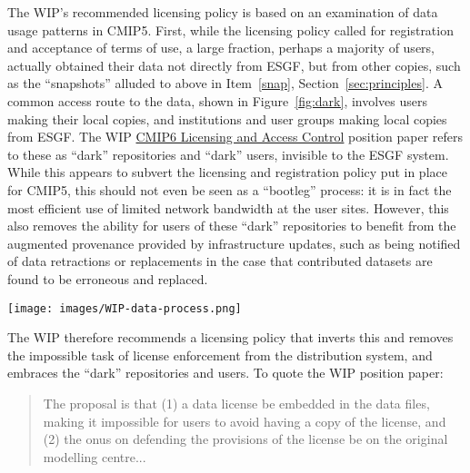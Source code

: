 \documentclass[gmd,manuscript]{copernicus}
\newcommand{\figref}[1] {\mbox{Figure   \ref{fig:#1}}}
\newcommand{\secref}[1] {\mbox{Section  \ref{sec:#1}}}
\begin{document}
The WIP's recommended licensing policy is based on an examination of
data usage patterns in CMIP5. First, while the licensing policy called
for registration and acceptance of terms of use, a large fraction,
perhaps a majority of users, actually obtained their data not directly
from ESGF, but from other copies, such as the ``snapshots'' alluded to
above in Item~\ref{snap}, \secref{principles}. 
A common access route to the data, shown in \figref{dark}, involves
users making their local copies, and institutions and user groups
making local copies from ESGF. The WIP
\href{https://goo.gl/h4HSP1}{CMIP6 Licensing and Access Control}
position paper refers to these as ``dark'' repositories and ``dark''
users, invisible to the ESGF system. While this appears to subvert the
licensing and registration policy put in place for CMIP5, this should
not even be seen as a ``bootleg'' process: it is in fact the most
efficient use of limited network bandwidth at the user sites. However, 
this also removes the ability for users of these ``dark'' repositories 
to benefit from the augmented provenance provided by infrastructure 
updates, such as being notified of data retractions or replacements 
in the case that contributed datasets are found to be erroneous and 
replaced.

\begin{figure*}
  \begin{center}
    \texttt{[image: images/WIP-data-process.png]}
  \end{center}
  \caption{Typical data usage pattern in CMIP5 involved users making
    local copies, and user groups making institutional-scale caches
    from ESGF. Figure courtesy Stephan Kindermann, DKRZ, adapted from
    WIP Licensing White Paper.}
  \label{fig:dark}
\end{figure*}

The WIP therefore recommends a licensing policy that inverts this and
removes the impossible task of license enforcement from the distribution 
system, and embraces the ``dark'' repositories and users.
To quote the WIP position paper:

\begin{quote}
  The proposal is that (1) a data license be embedded in the data
  files, making it impossible for users to avoid having a copy of the
  license, and (2) the onus on defending the provisions of the license
  be on the original modelling centre...
\end{quote}
\end{document}
